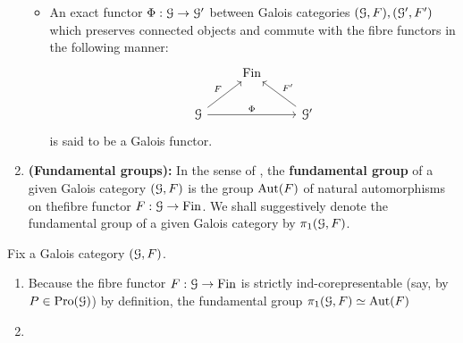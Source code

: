 \begin{definition}
\begin{enumerate}
\begin{itemize}
                        \item An exact functor $\Phi: \mathcal{G} \to \mathcal{G}'$ between Galois categories $(\mathcal{G}, F), (\mathcal{G}', F')$ which preserves connected objects and commute with the fibre functors in the following manner:
                            $$
                                \begin{tikzcd}
                                	& \Fin \\
                                	\calG && {\calG'}
                                	\arrow["F", from=2-1, to=1-2]
                                	\arrow["{F'}"', from=2-3, to=1-2]
                                	\arrow["\Phi", from=2-1, to=2-3]
                                \end{tikzcd}
                            $$
                        is said to be a Galois functor.
                    \end{itemize}
                \item \textbf{(Fundamental groups):} In the sense of \cite[Theorem 2.16]{noohi_fundamental_group}, the \textbf{fundamental group} of a given Galois category $(\mathcal{G}, F)$ is the group $\mathrm{Aut}(F)$ of natural automorphisms on thefibre functor $F: \mathcal{G} \to \mathrm{Fin}$. We shall suggestively denote the fundamental group of a given Galois category by $\pi_1(\mathcal{G}, F)$. 
            \end{enumerate}
        \end{definition}
        \begin{remark} \label{remark: basic_properties_of_galois_categories}
            Fix a Galois category $(\mathcal{G}, F)$.
            \begin{enumerate}
                \item Because the fibre functor $F: \mathcal{G} \to \mathrm{Fin}$ is strictly ind-corepresentable (say, by $P \in \mathrm{Pro}(\mathcal{G})$) by definition, the fundamental group $\pi_1(\mathcal{G}, F) \simeq \mathrm{Aut}(F)$
                \item 
            \end{enumerate}
        \end{remark}
        
